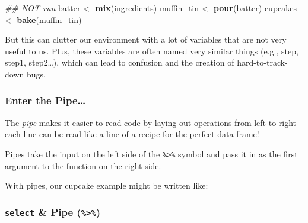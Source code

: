 \documentclass[
]{book}
\newenvironment{Shaded}{\begin{snugshade}}{\end{snugshade}}
\newcommand{\CommentTok}[1]{\textcolor[rgb]{0.56,0.35,0.01}{\textit{#1}}}
\newcommand{\KeywordTok}[1]{\textcolor[rgb]{0.13,0.29,0.53}{\textbf{#1}}}
\newcommand{\NormalTok}[1]{#1}
\newcommand{\OperatorTok}[1]{\textcolor[rgb]{0.81,0.36,0.00}{\textbf{#1}}}
\newcommand{\StringTok}[1]{\textcolor[rgb]{0.31,0.60,0.02}{#1}}
\begin{document}
\begin{Shaded}
\begin{Highlighting}[]
\CommentTok{## NOT run}
\NormalTok{batter <-}\StringTok{ }\KeywordTok{mix}\NormalTok{(ingredients)}
\NormalTok{muffin_tin <-}\StringTok{ }\KeywordTok{pour}\NormalTok{(batter)}
\NormalTok{cupcakes <-}\StringTok{ }\KeywordTok{bake}\NormalTok{(muffin_tin)}
\end{Highlighting}
\end{Shaded}

But this can clutter our environment with a lot of variables that are not very useful to us. Plus, these variables are often named very similar things (e.g., step, step1, step2\ldots), which can lead to confusion and the creation of hard-to-track-down bugs.

\hypertarget{enter-the-pipe}{%
\subsubsection*{Enter the Pipe\ldots{}}\label{enter-the-pipe}}

The \emph{pipe} makes it easier to read code by laying out operations from left to right -- each line can be read like a line of a recipe for the perfect data frame!

Pipes take the input on the left side of the \texttt{\%\textgreater{}\%} symbol and pass it in as the first argument to the function on the right side.

With pipes, our cupcake example might be written like:

\begin{Shaded}
\end{Shaded}

\hypertarget{select-pipe}{%
\subsubsection*{\texorpdfstring{\texttt{select} \& Pipe (\texttt{\%\textgreater{}\%})}{select \& Pipe (\%\textgreater\%)}}\label{select-pipe}}
\end{document}
